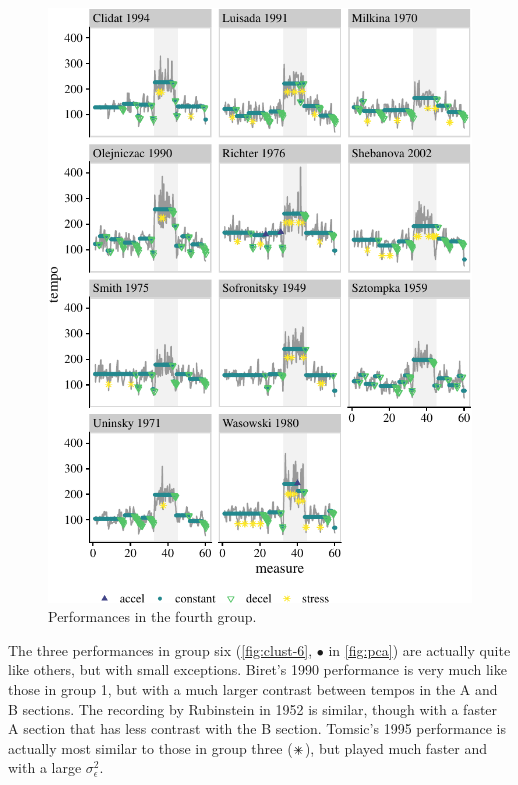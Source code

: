 \documentclass[aoas]{imsart}
\begin{document}
\begin{figure}

{\centering \includegraphics{gfx/clust-4-1} 

}

\caption{Performances in the fourth group.}\label{fig:clust-4}
\end{figure}

The three performances in group six (\autoref{fig:clust-6}, \(\bullet\)
in \autoref{fig:pca}) are actually quite like others, but with small
exceptions. Biret's 1990 performance is very much like those in group 1,
but with a much larger contrast between tempos in the A and B sections.
The recording by Rubinstein in 1952 is similar, though with a faster A
section that has less contrast with the B section. Tomsic's 1995
performance is actually most similar to those in group three
(\(\mathrlap{+}\times\)), but played much faster and with a large
\(\sigma^2_\epsilon\).
\end{document}
